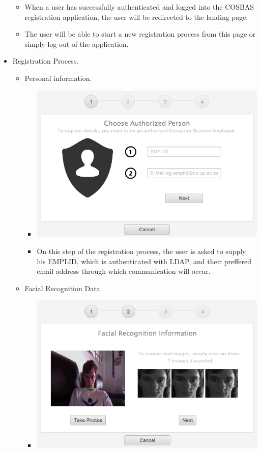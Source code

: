 \begin{itemize}
\begin{itemize}
				\item When a user has successfully authenticated and logged into the COSBAS registration application, the user will be redirected to the landing page.
				\item The user will be able to start a new registration process from this page or simply log out of the application.
			\end{itemize}
		\item Registration Process.
			\begin{itemize}
				\item Personal information.
				\begin{itemize}
					\item \includegraphics[width=\linewidth]{images/Screenshots/Registration/Reg_Step1.png}
					\item On this step of the registration process, the user is asked to supply his EMPLID, which is authenticated with LDAP, and their preffered email address through which communication will occur.
				\end{itemize}
				\item Facial Recognition Data.
				\begin{itemize}
					\item \includegraphics[width=\linewidth]{images/Screenshots/Registration/Reg_Step2.png}

\end{itemize}
\end{itemize}
\end{itemize}
